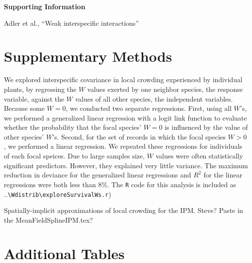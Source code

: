 \documentclass[11pt]{article}
\begin{document}


\clearpage 
\newpage 

\setcounter{page}{1}
\setcounter{equation}{0}
\setcounter{figure}{0}
\setcounter{section}{0}
\setcounter{table}{0}
\renewcommand{\theequation}{SI.\arabic{equation}}
\renewcommand{\thetable}{SI-\arabic{table}}
\renewcommand{\thefigure}{SI-\arabic{figure}}
\renewcommand{\thesection}{Section SI.\arabic{section}}

\centerline{\Large \textbf{Supporting Information }}
\centerline{Adler et al., ``Weak interspecific interactions''} 

\vspace{0.4in} 

\section{Supplementary Methods} \label{suppMethods}

We explored interspecific covariance in local crowding experienced by individual plants, by regressing the $W$ values exerted by one neighbor species, the response variable, against the $W$ values of all other species, the independent variables. Because some $W=0$, we conducted two separate regressions. First, using all $W$'s, we performed a generalized linear regression with a logit link function to evaluate whether the probability that the focal species' $W=0$ is influenced by the value of other species' $W$'s. Second, for the set of records in which the focal species $W>0$, we performed a linear regression. We repeated these regressions for individuals of each focal speices. Due to large samples size, $W$ values were often statistically significant predictors. However, they explained very little variance. The maximum reduction in deviance for the generalized linear regressions and $R^2$ for the linear regressions were both less than 8\%. The \texttt{R} code for this analysis is included as ..\texttt{\textbackslash Wdistrib\textbackslash exploreSurvivalWs.r})

Spatially-implicit approximations of local crowding for the IPM. Steve? Paste in the MeanFieldSplineIPM.tex?


\section{Additional Tables} 
\end{document}
